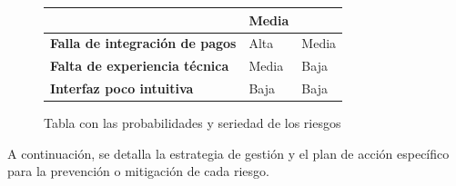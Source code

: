 \begin{figure}[H]
\begin{tabularx}{\textwidth}{|X|l|l|}
        & 
        
            Media 
        
    \\ \hline
    
            \textbf{Falla de integración de pagos} 
        
        & 
        
            Alta 
        
        & 
        
            Media 
        
    \\ \hline
    
            \textbf{Falta de experiencia técnica} 
        
        & 
        
            Media 
        
        & 
        
            Baja 
        
    \\ \hline
    
            \textbf{Interfaz poco intuitiva} 
        
        & 
        
            Baja 
        
        & 
        
            Baja 
        
    \\ \hline
    \end{tabularx}
    \caption{Tabla con las probabilidades y seriedad de los riesgos}
\end{figure}

A continuación, se detalla la estrategia de gestión y el plan de acción específico para la prevención o mitigación de cada riesgo.

